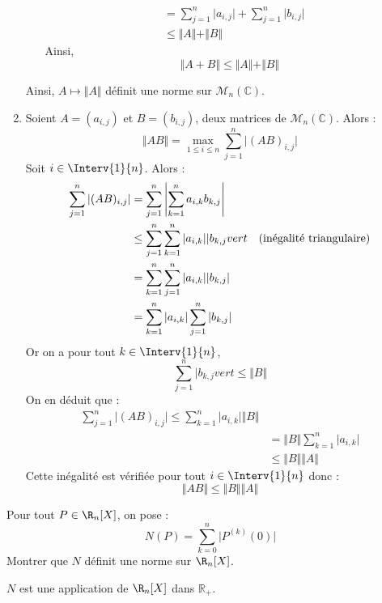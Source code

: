 \documentclass[a4paper,10pt]{report}
\begin{document}
\begin{enumerate}
\begin{itemize}
\begin{align*}
 & = \sum_{j=1}^n \vert a_{i,j} \vert + \sum_{j=1}^n \vert b_{i,j} \vert  \\
 & \leq \Vert A \Vert + \Vert B \Vert
 \end{align*}
Ainsi,
$$ \Vert A+B \Vert \leq \Vert A \Vert + \Vert B \Vert$$
\end{itemize}
Ainsi, $A \mapsto \Vert A \Vert$ définit une norme sur $\mathcal{M}_{n}(\mathbb{C})$.
\item Soient $A=(a_{i,j})$ et $B=(b_{i,j})$, deux matrices de $\mathcal{M}_n(\mathbb{C})$. Alors :
$$ \Vert AB \Vert = \max_{1 \leq i \leq n} \sum_{j=1}^n \vert (AB)_{i,j} \vert$$
Soit $i \in \Interv{1}{n}$. Alors :
\begin{align*}
\sum_{j=1}^n \vert (AB)_{i,j} \vert & = \sum_{j=1}^n \left\vert \sum_{k=1}^n a_{i,k} b_{k,j} \right\vert \\
& \leq  \sum_{j=1}^n  \sum_{k=1}^n \vert a_{i,k} \vert \vert b_{k,j} vert \quad \hbox{(inégalité triangulaire)} \\
& = \sum_{k=1}^n  \sum_{j=1}^n \vert a_{i,k} \vert \vert b_{k,j} \vert  \\
& =  \sum_{k=1}^n \vert a_{i,k} \vert  \sum_{j=1}^n \vert b_{k,j} \vert  
\end{align*}
Or on a pour tout $k \in \Interv{1}{n}$,
$$ \sum_{j=1}^n \vert b_{k,j} vert   \leq \Vert B \Vert$$
On en déduit que :
\begin{align*}
\sum_{j=1}^n \vert (AB)_{i,j} \vert  \leq  \sum_{k=1}^n \vert a_{i,k} \vert \Vert B \Vert \\
& = \Vert B \Vert  \sum_{k=1}^n \vert a_{i,k} \vert \\
& \leq \Vert B \Vert \Vert A \Vert
\end{align*}
Cette inégalité est vérifiée pour tout $i \in \Interv{1}{n}$ donc :
$$ \Vert AB \Vert \leq \Vert B \Vert \Vert A \Vert$$
\end{enumerate}


\begin{Exercice}{} Pour tout $P  \in \R_n[X ]$, on pose :
$$N(P) = \sum_{k = 0}^{ n } \vert P^{(k)} (0) \vert $$
Montrer que $N$ définit une norme sur $\R_n [X]$.
\end{Exercice}

\corr $N$ est une application de $\R_n[X ]$ dans $\mathbb{R}_+$.
\end{document}
